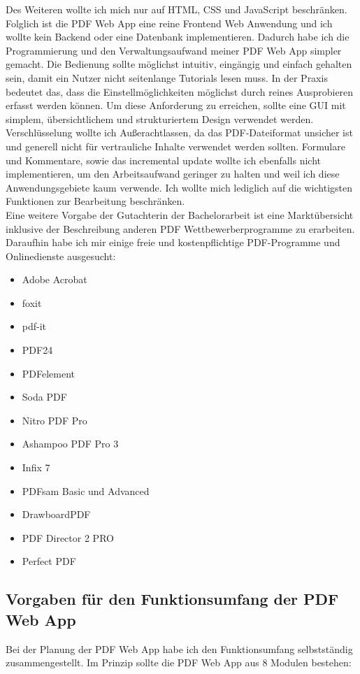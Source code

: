 Des Weiteren wollte ich mich nur auf HTML, CSS und JavaScript beschränken. Folglich ist die PDF Web App eine reine Frontend Web Anwendung und ich wollte kein Backend oder eine Datenbank implementieren. Dadurch habe ich die Programmierung und den Verwaltungsaufwand meiner PDF Web App simpler gemacht. Die Bedienung sollte möglichst intuitiv, eingängig und einfach gehalten sein, damit ein Nutzer nicht seitenlange Tutorials lesen muss. In der Praxis bedeutet das, dass die Einstellmöglichkeiten möglichst durch reines Ausprobieren erfasst werden können. Um diese Anforderung zu erreichen, sollte eine GUI mit simplem, übersichtlichem und strukturiertem Design verwendet werden. Verschlüsselung wollte ich Außerachtlassen, da das PDF-Dateiformat unsicher ist und generell nicht für vertrauliche Inhalte verwendet werden sollten. Formulare und Kommentare, sowie das incremental update wollte ich ebenfalls nicht implementieren, um den Arbeitsaufwand geringer zu halten und weil ich diese Anwendungsgebiete kaum verwende. Ich wollte mich lediglich auf die wichtigsten Funktionen zur Bearbeitung beschränken. \\
Eine weitere Vorgabe der Gutachterin der Bachelorarbeit ist eine Marktübersicht inklusive der Beschreibung anderen PDF Wettbewerberprogramme zu erarbeiten. Daraufhin habe ich mir einige freie und kostenpflichtige PDF-Programme und Onlinedienste ausgesucht: 

\begin{itemize}
	\item Adobe Acrobat
	\item foxit
	\item pdf-it
	\item PDF24
	\item PDFelement
	\item Soda PDF
	\item Nitro PDF Pro 
	\item Ashampoo PDF Pro 3
	\item Infix 7
	\item PDFsam Basic und Advanced
	\item DrawboardPDF
	\item PDF Director 2 PRO
	\item Perfect PDF
\end{itemize}


\subsection{Vorgaben für den Funktionsumfang der PDF Web App}
Bei der Planung der PDF Web App habe ich den Funktionsumfang selbstständig zusammengestellt. Im Prinzip sollte die PDF Web App aus 8 Modulen bestehen:

